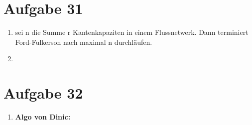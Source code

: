 \documentclass[10pt,a4paper]{article}
\begin{document}
\section*{Aufgabe 31}

    \begin{enumerate}[label={\alph*)}]
        \item 
            sei n die Summe r Kantenkapaziten in einem Flussnetwerk.
            Dann terminiert Ford-Fulkerson nach maximal n durchläufen.
        \item
    \end{enumerate}


\section*{Aufgabe 32}

    \begin{enumerate}[label={\alph*)}]
        \item \textbf{Algo von Dinic:} \\
            
    \end{enumerate}
\end{document}

